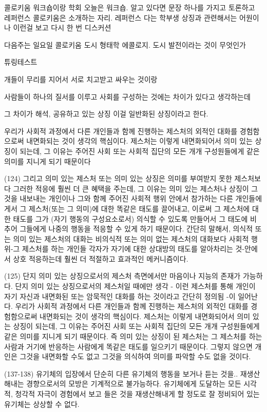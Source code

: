 \documentclass[12pt, a4paper]{article}
\begin{document}
콜로키움 워크숍이랑 학회
오늘은 워크숍. 알고 있다면 문장 하나를 가지고 토론하고 레퍼런스
콜로키움은 소개하는 자리. 레퍼런스 다는 학부생
상징과 관련해서는 어원이나 이런걸 보고 다시 한 번 디스커션

다음주는 일요일 콜로키움 도시 형태학 에콜로지. 도시 발전이라는 것이 무엇인가

튜링테스트

개들이 무리를 지어서 서로 치고받고 싸우는 것이랑

사람들이 하나의 질서를 이루고 사회를 구성하는 것에는 차이가 있다고 생각하는데

그 차이가 해석, 공유하고 있는 상징 이걸 일반화된 상징이라고 한다.

우리가 사회적 과정에서 다른 개인들과 함께 진행하는 제스처의
외적인 대화를 경험함으로써 내면화되는 것이 생각의 핵심이다. 제스처는 이렇게
내면화되어서 의미 있는 상징이 되는데, 그 이유는 주어진 사회 또는 사회적 집단의
모든 개개 구성원들에게 같은 의미를 지니게 되기 때문이다


(124) 그리고 의미 있는 제스처 또는 의미 있는 상징은 의미를 부여받지 못한 제스처보다 그러한 적응에 훨씬 더 큰 혜택을 주는데, 그 이유는 의미 있는 제스처나 상징이 그것을 내보내는 개인이나 그와 함께 주어진 사회적 행위 안에서 참가하는 다른 개인들에게서 그 제스처(또는 그 의미)에 대한 똑같은 태도를 끌어내고, 이로써 그 제스처에 대한 태도를 그가 (자기 행동의 구성요소로서) 의식할 수 있도록 만들어서 그 태도에 비추어 그들에게 나중의 행동을 적응할 수 있게 하기 때문이다. 간단히 말해서, 의식적 또는 의미 있는 제스처의 대화는 비의식적 또는 의미 없는 제스처의 대화보다 사회적 행위-그 제스처를 하는 개인들 각자가 자기에 대한 상대방의 태도를 알아차리는 것-안에서 상호 적응하는데 훨씬 더 적절하고 효과적인 메커니즘이다.

(125) 단지 의미 있는 상징으로서의 제스처 측면에서만 마음이나 지능의 존재가 가능하다. 단지 의미 있는 상징으로서의 제스처일 때에만 생각 - 이런 제스처를 통해 개인이 자기 자신과 내면화된 또는 암묵적인 대화를 하는 것이라고 간단히 정의됨 -이 일어난다. 우리가 사회적 과정에서 다른 개인들과 함께 진행하는 제스처의 외적인 대화를 경험함으로써 내면화되는 것이 생각의 핵심이다. 제스처는 이렇게 내면화되어서 의미 있는 상징이 되는데, 그 이유는 주어진 사회 또는 사회적 집단의 모든 개개 구성원들에게 같은 의미를 지니게 되기 때문이다. 즉 의미 있는 상징이 된 제스처는 그 제스처를 하는 사람과 거기에 반응하는 사람에게 똑같은 태도를 일으키기 때문이다. 그렇지 않으면 개인은 그것을 내면화할 수도 없고 그것을 의식하여 의미를 파악할 수도 없을 것이다.

(137-138) 유기체의 입장에서 단순히 다른 유기체의 행동을 보거나 듣는 것을.. 재생산해내는 경향으로서의 모방은 기계적으로 불가능하다. 유기체에게 도달하는 모든 시각적, 청각적 자극이 경험에서 보고 들은 것을 재생산해내게 할 정도로 잘 정비되어 있는 유기체는 상상할 수 없다.
\end{document}
